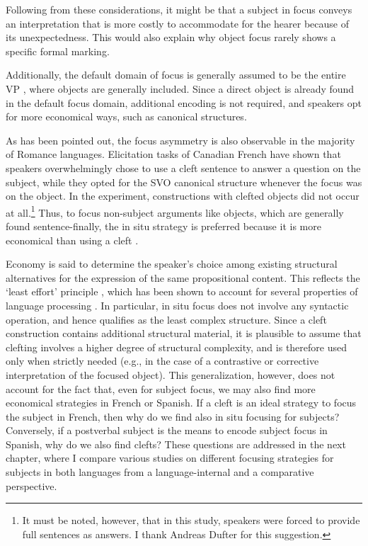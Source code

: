 Following from these considerations, it might be that a subject in focus conveys an interpretation that is more costly to accommodate for the hearer because of its  unexpectedness. This would also explain why object focus rarely shows a specific formal marking. 

Additionally, the default domain of focus is generally assumed  to be the entire VP \parencite{drubig2003toward}, where objects are generally included. Since a direct object is already found in the default focus domain, additional encoding is not required, and speakers opt for more economical ways, such as canonical structures. 

As has been pointed out, the focus asymmetry is also observable in the majority of Romance languages. Elicitation tasks of Canadian French \parencite{skopeteas2010focus} have shown that speakers overwhelmingly chose to use a cleft sentence to answer a question on the subject, while they opted for the SVO canonical structure whenever the focus was on the object. In the experiment, constructions with clefted objects did not occur at all.\footnote{It must be noted, however, that in this study, speakers were forced to provide full sentences as answers. I thank Andreas Dufter for this suggestion.} 
Thus, to focus non-subject arguments like objects, which are generally found sentence-finally, the in situ strategy is preferred because it is more economical than using a cleft \parencite{destruel2012french}. 

Economy is said to determine the speaker’s choice among existing structural alternatives for the expression of the same propositional content. This reflects the ‘least effort’ principle \parencite{zipf1949human}, which has been shown to account for several properties of language processing \parencite{skopeteas2010focus, SkopeteasFanselow2011}.
In particular, in situ focus does not involve any syntactic operation, and hence qualifies as the least complex structure. Since a cleft construction contains additional structural material, it is plausible to assume that clefting involves a higher degree of structural complexity, and is therefore used only when strictly needed (e.g., in the case of a contrastive or corrective interpretation of the focused object). This generalization, however, does not account for the fact that, even for subject focus, we may also find more economical strategies in French or Spanish. If a cleft is an ideal strategy to focus the subject in French, then why do we find also in situ focusing for subjects? Conversely, if a postverbal subject is the means to encode subject focus in Spanish, why do we also find clefts? 
These questions are addressed in the next chapter, where I compare various studies on different focusing strategies for subjects in both languages from a language-internal and a comparative perspective.


